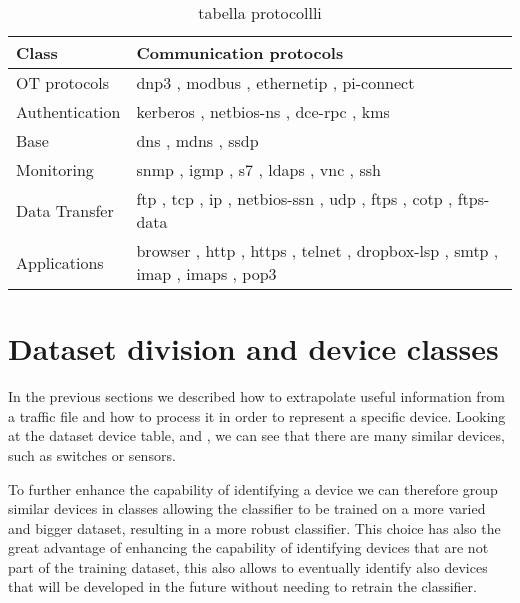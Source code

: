 \begin{table}
\centering
\begin{tabular}{|l|l|}
\hline
\textbf{Class} & \textbf{Communication protocols} \\
\hline
OT protocols   &  dnp3 ,  modbus ,  ethernetip ,   pi-connect \\
Authentication & kerberos ,  netbios-ns ,  dce-rpc ,  kms \\
Base           & dns ,  mdns ,  ssdp \\
Monitoring     & snmp ,  igmp ,  s7 ,  ldaps ,  vnc ,  ssh \\
Data Transfer  & ftp ,  tcp ,  ip ,  netbios-ssn ,  udp ,  ftps ,  cotp ,   ftps-data \\
Applications   & browser ,  http ,  https ,  telnet ,    dropbox-lsp ,  smtp ,  imap ,  imaps ,  pop3  \\
\hline
\end{tabular}
\caption{tabella protocollli}
\label{tab:protolist}
\end{table}

\section{Dataset division and device classes}

In the previous sections we described how to extrapolate useful information from a traffic file and how to process it in order to represent a specific device. Looking at the dataset device table,  and , we can see that there are many similar devices, such as switches or sensors. 

To further enhance the capability of identifying a device we can therefore group similar devices in classes allowing the classifier to be trained on a more varied and bigger dataset, resulting in a more robust classifier. This choice has also the great advantage of enhancing the capability of identifying devices that are not part of the training dataset, this also allows to eventually identify also devices that will be developed in the future without needing to retrain the classifier.

